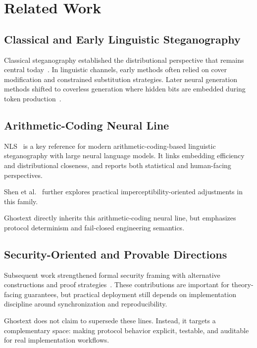\section{Related Work}

\subsection{Classical and Early Linguistic Steganography}

Classical steganography established the distributional perspective that remains central today~\cite{cox2005information}. In linguistic channels, early methods often relied on cover modification and constrained substitution strategies. Later neural generation methods shifted to coverless generation where hidden bits are embedded during token production~\cite{fang2017generating,yang2019rnnstega,dai2019towards}.

\subsection{Arithmetic-Coding Neural Line}

NLS~\cite{ziegler2019neural} is a key reference for modern arithmetic-coding-based linguistic steganography with large neural language models. It links embedding efficiency and distributional closeness, and reports both statistical and human-facing perspectives.

Shen et al.~\cite{shen2020near} further explores practical imperceptibility-oriented adjustments in this family.

Ghostext directly inherits this arithmetic-coding neural line, but emphasizes protocol determinism and fail-closed engineering semantics.

\subsection{Security-Oriented and Provable Directions}

Subsequent work strengthened formal security framing with alternative constructions and proof strategies~\cite{zhang2021provably,kaptchuk2021language,ding2023discop,dewitt2024perfect}. These contributions are important for theory-facing guarantees, but practical deployment still depends on implementation discipline around synchronization and reproducibility.

Ghostext does not claim to supersede these lines. Instead, it targets a complementary space: making protocol behavior explicit, testable, and auditable for real implementation workflows.

